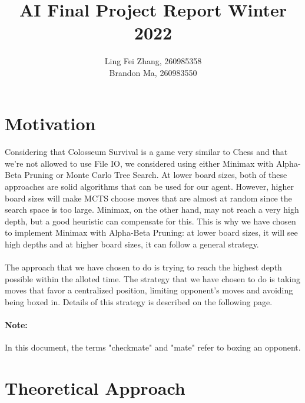 \documentclass[12pt,a4paper]{article}
\author{Ling Fei Zhang, 260985358\\
Brandon Ma, 260983550}
\begin{document}
\title{AI Final Project Report Winter 2022}    
\maketitle


\section{Motivation}
\paragraph{} Considering that Colosseum Survival is a game very similar to Chess and that we're not allowed to 
use File IO, we considered using either Minimax with Alpha-Beta Pruning or Monte Carlo Tree Search. At 
lower board sizes, both of these approaches are solid algorithms that can be used for our agent. However, higher board 
sizes will make MCTS choose moves that are almost at random since the search space is too large. Minimax, on the other 
hand, may not reach a very high depth, but a good heuristic can compensate for this. This is why we have chosen to 
implement Minimax with Alpha-Beta Pruning: at lower board sizes, it will see high depths and at higher board 
sizes, it can follow a general strategy. 
\paragraph{} The approach that we have chosen to do is trying to reach the highest depth possible within the alloted 
time. The strategy that we have chosen to do is taking moves that favor a centralized position, limiting opponent's 
moves and avoiding being boxed in. Details of this strategy is described on the following page. 
\paragraph{Note:} In this document, the terms "checkmate" and "mate" refer to boxing an opponent. 
\pagebreak

\section{Theoretical Approach}
\end{document}
